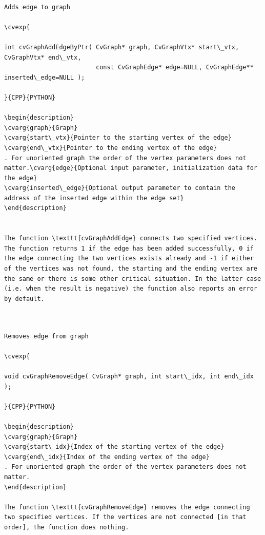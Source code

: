 \begin{verbatim}

Adds edge to graph

\cvexp{

int cvGraphAddEdgeByPtr( CvGraph* graph, CvGraphVtx* start\_vtx, CvGraphVtx* end\_vtx,
                         const CvGraphEdge* edge=NULL, CvGraphEdge** inserted\_edge=NULL );

}{CPP}{PYTHON}

\begin{description}
\cvarg{graph}{Graph}
\cvarg{start\_vtx}{Pointer to the starting vertex of the edge}
\cvarg{end\_vtx}{Pointer to the ending vertex of the edge}
. For unoriented graph the order of the vertex parameters does not matter.\cvarg{edge}{Optional input parameter, initialization data for the edge}
\cvarg{inserted\_edge}{Optional output parameter to contain the address of the inserted edge within the edge set}
\end{description}


The function \texttt{cvGraphAddEdge} connects two specified vertices. The function returns 1 if the edge has been added successfully, 0 if the edge connecting the two vertices exists already and -1 if either of the vertices was not found, the starting and the ending vertex are the same or there is some other critical situation. In the latter case (i.e. when the result is negative) the function also reports an error by default.


\end{verbatim}
\label{GraphRemoveEdge}
\begin{verbatim}

Removes edge from graph

\cvexp{

void cvGraphRemoveEdge( CvGraph* graph, int start\_idx, int end\_idx );

}{CPP}{PYTHON}

\begin{description}
\cvarg{graph}{Graph}
\cvarg{start\_idx}{Index of the starting vertex of the edge}
\cvarg{end\_idx}{Index of the ending vertex of the edge}
. For unoriented graph the order of the vertex parameters does not matter.
\end{description}

The function \texttt{cvGraphRemoveEdge} removes the edge connecting two specified vertices. If the vertices are not connected [in that order], the function does nothing.


\end{verbatim}

